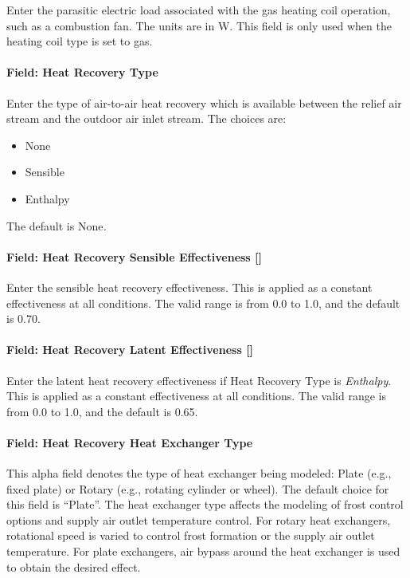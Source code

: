Enter the parasitic electric load associated with the gas heating coil operation, such as a combustion fan. The units are in W. This field is only used when the heating coil type is set to gas.

\paragraph{Field: Heat Recovery Type}\label{field-heat-recovery-type-8}

Enter the type of air-to-air heat recovery which is available between the relief air stream and the outdoor air inlet stream. The choices are:

\begin{itemize}
\item
  None
\item
  Sensible
\item
  Enthalpy
\end{itemize}

The default is None\emph{.}

\paragraph{Field: Heat Recovery Sensible Effectiveness {[]}}\label{field-heat-recovery-sensible-effectiveness}

Enter the sensible heat recovery effectiveness. This is applied as a constant effectiveness at all conditions. The valid range is from 0.0 to 1.0, and the default is 0.70.

\paragraph{Field: Heat Recovery Latent Effectiveness {[]}}\label{field-heat-recovery-latent-effectiveness}

Enter the latent heat recovery effectiveness if Heat Recovery Type is \emph{Enthalpy}. This is applied as a constant effectiveness at all conditions. The valid range is from 0.0 to 1.0, and the default is 0.65.

\paragraph{Field: Heat Recovery Heat Exchanger Type}\label{field-heat-recovery-heat-exchanger-type-3}

This alpha field denotes the type of heat exchanger being modeled: Plate (e.g., fixed plate) or Rotary (e.g., rotating cylinder or wheel). The default choice for this field is ``Plate''. The heat exchanger type affects the modeling of frost control options and supply air outlet temperature control. For rotary heat exchangers, rotational speed is varied to control frost formation or the supply air outlet temperature. For plate exchangers, air bypass around the heat exchanger is used to obtain the desired effect.

